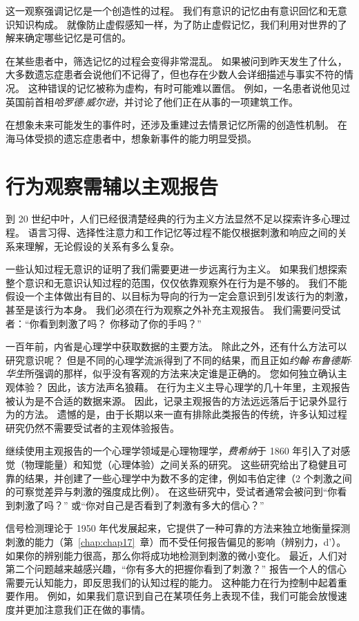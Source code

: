 这一观察强调记忆是一个创造性的过程。
我们有意识的记忆由有意识回忆和无意识知识构成。
就像防止虚假感知一样，为了防止虚假记忆，我们利用对世界的了解来确定哪些记忆是可信的。


在某些患者中，筛选记忆的过程会变得非常混乱。
如果被问到昨天发生了什么，大多数遗忘症患者会说他们不记得了，但也存在少数人会详细描述与事实不符的情况。
这种错误的记忆被称为虚构，有时可能难以置信。
例如，一名患者说他见过英国前首相\textit{哈罗德$\cdot$威尔逊}，并讨论了他们正在从事的一项建筑工作。


在想象未来可能发生的事件时，还涉及重建过去情景记忆所需的创造性机制。
在海马体受损的遗忘症患者中，想象新事件的能力明显受损。



\section{行为观察需辅以主观报告}

到 20 世纪中叶，人们已经很清楚经典的行为主义方法显然不足以探索许多心理过程。
语言习得、选择性注意力和工作记忆等过程不能仅根据刺激和响应之间的关系来理解，无论假设的关系有多么复杂。


一些认知过程无意识的证明了我们需要更进一步远离行为主义。
如果我们想探索整个意识和无意识认知过程的范围，仅仅依靠观察外在行为是不够的。
我们不能假设一个主体做出有目的、以目标为导向的行为一定会意识到引发该行为的刺激，甚至是该行为本身。
我们必须在行为观察之外补充主观报告。
我们需要问受试者：“你看到刺激了吗？
你移动了你的手吗？”


一百年前，内省是心理学中获取数据的主要方法。
除此之外，还有什么方法可以研究意识呢？
但是不同的心理学流派得到了不同的结果，而且正如\textit{约翰$\cdot$布鲁德斯$\cdot$华生}所强调的那样，似乎没有客观的方法来决定谁是正确的。
您如何独立确认主观体验？
因此，该方法声名狼藉。
在行为主义主导心理学的几十年里，主观报告被认为是不合适的数据来源。
因此，记录主观报告的方法远远落后于记录外显行为的方法。
遗憾的是，由于长期以来一直有排除此类报告的传统，许多认知过程研究仍然不需要受试者的主观体验报告。


继续使用主观报告的一个心理学领域是心理物理学，\textit{费希纳}于 1860 年引入了对感觉（物理能量）和知觉（心理体验）之间关系的研究。
这些研究给出了稳健且可靠的结果，并创建了一些心理学中为数不多的定律，例如韦伯定律（2 个刺激之间的可察觉差异与刺激的强度成比例）。
在这些研究中，受试者通常会被问到“你看到刺激了吗？” 或“你对自己是否看到了刺激有多大的信心？”


信号检测理论于 1950 年代发展起来，它提供了一种可靠的方法来独立地衡量探测刺激的能力（第~\ref{chap:chap17}~章）而不受任何报告偏见的影响（辨别力，d'）。
如果你的辨别能力很高，那么你将成功地检测到刺激的微小变化。
最近，人们对第二个问题越来越感兴趣，“你有多大的把握你看到了刺激？” 
报告一个人的信心需要元认知能力，即反思我们的认知过程的能力。
这种能力在行为控制中起着重要作用。
例如，如果我们意识到自己在某项任务上表现不佳，我们可能会放慢速度并更加注意我们正在做的事情。


